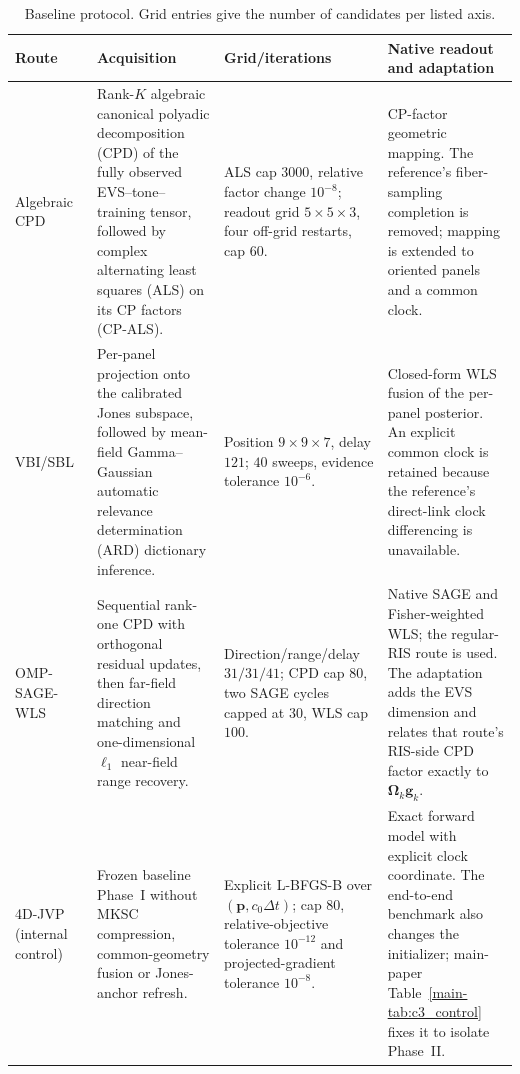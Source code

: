 \documentclass[journal,letterpaper]{IEEEtran}
\newcommand{\bg}{\mathbf{g}}
\newcommand{\bp}{\mathbf{p}}
\newcommand{\bOmega}{\boldsymbol{\Omega}}
\begin{document}
\begin{table}[!t]
\caption{Baseline protocol.  Grid entries give the number of candidates per
listed axis.}
\label{tab:s_baselines}
\centering
\scriptsize
\setlength{\tabcolsep}{3pt}
\renewcommand{\arraystretch}{1.07}
\begin{tabular}{@{}p{}p{}p{}p{}@{}}
\toprule
Route & Acquisition & Grid/iterations & Native readout and adaptation \\
\midrule
Algebraic CPD~\cite{lin2021tensor} & Rank-$K$ algebraic canonical polyadic
decomposition (CPD) of the fully observed EVS--tone--training tensor,
followed by complex alternating least squares (ALS) on its CP factors
(CP-ALS). & ALS cap
$3000$, relative factor change $10^{-8}$; readout grid $5\times5\times3$,
four off-grid restarts, cap $60$. & CP-factor geometric mapping.  The
reference's fiber-sampling completion is removed; mapping is extended to
oriented panels and a common clock. \\
VBI/SBL~\cite{li2024vbi} & Per-panel projection onto the calibrated Jones
subspace, followed by mean-field Gamma--Gaussian automatic relevance
determination (ARD) dictionary inference. &
Position $9\times9\times7$, delay $121$; $40$ sweeps, evidence tolerance
$10^{-6}$. & Closed-form WLS fusion of the per-panel posterior.  An explicit
common clock is retained because the reference's direct-link clock
differencing is unavailable. \\
OMP-SAGE-WLS~\cite{yan2025ris} & Sequential rank-one CPD with orthogonal
residual updates, then far-field direction matching and one-dimensional
$\ell_1$ near-field range recovery. & Direction/range/delay $31/31/41$;
CPD cap $80$, two SAGE cycles capped at $30$, WLS cap $100$. & Native SAGE
and Fisher-weighted WLS; the regular-RIS route is used.  The adaptation adds
the EVS dimension and relates that route's RIS-side CPD factor exactly to
$\bOmega_k\bg_k$. \\
4D-JVP (internal control) & Frozen baseline Phase~I without MKSC compression,
common-geometry fusion or Jones-anchor refresh. & Explicit L-BFGS-B over
$(\bp,c_0\Delta t)$; cap $80$, relative-objective tolerance $10^{-12}$ and
projected-gradient tolerance $10^{-8}$. & Exact forward model with explicit
clock coordinate.  The end-to-end benchmark also changes the initializer;
main-paper Table~\ref{main-tab:c3_control} fixes it to isolate Phase~II. \\
\bottomrule
\end{tabular}
\end{table}
\end{document}
